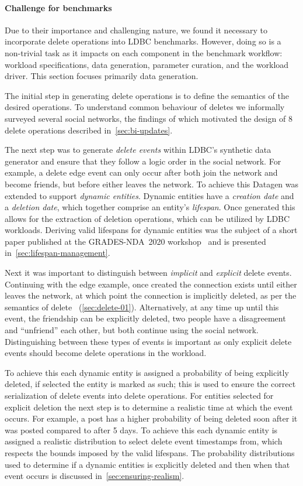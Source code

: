 \paragraph{Challenge for benchmarks}
Due to their importance and challenging nature, we found it necessary to incorporate delete operations into LDBC benchmarks.
However, doing so is a non-trivial task as it impacts on each component in the benchmark workflow:
workload specifications, data generation, parameter curation, and the workload driver.
This section focuses primarily data generation.

The initial step in generating delete operations is to define the semantics of the desired operations.
To understand common behaviour of deletes we informally surveyed several social networks, the findings of which motivated the design
of 8 delete operations described in~\autoref{sec:bi-updates}.

The next step was to generate \emph{delete events} within LDBC's synthetic data generator and ensure that they follow a logic order in
the social network.
For example, a delete \tKnows edge event can only occur after both \tPersons join the network and become friends,
but before either \tPerson leaves the network.
To achieve this Datagen was extended to support \emph{dynamic entities}.
Dynamic entities have a \emph{creation date} and a \emph{deletion date}, which together comprise an entity's \emph{lifespan}.
Once generated this allows for the extraction of deletion operations, which can be utilized by LDBC workloads.
Deriving valid lifespans for dynamic entities was the subject of a short paper published at the GRADES-NDA~2020
workshop~\cite{DBLP:conf/sigmod/WaudbySPS20} and is presented in~\autoref{sec:lifespan-management}.

Next it was important to distinguish between \emph{implicit} and \emph{explicit} delete events.
Continuing with the \tKnows edge example, once created the connection exists until either \tPerson leaves the network,
at which point the connection is implicitly deleted, as per the semantics of delete \tPerson~(\autoref{sec:delete-01}).
Alternatively, at any time up until this event, the friendship can be explicitly deleted,
\ie two people have a disagreement and ``unfriend'' each other, but both continue using the social network.
Distinguishing between these types of events is important as only explicit delete events should become delete operations
in the workload.

To achieve this each dynamic entity is assigned a probability of being explicitly deleted, if selected the entity is marked as such;
this is used to ensure the correct serialization of delete events into delete operations.
For entities selected for explicit deletion the next step is to determine a realistic time at which the event occurs.
For example, a post has a higher probability of being deleted soon after it was posted compared to after 5 days.
To achieve this each dynamic entity is assigned a realistic distribution to select delete event timestamps from,
which respects the bounds imposed by the valid lifespans.
The probability distributions used to determine if a dynamic entities is explicitly deleted and then when that event occurs is discussed
in~\autoref{sec:ensuring-realism}.

